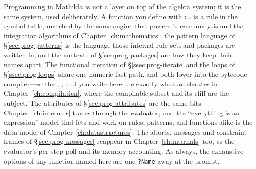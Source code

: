 Programming in Mathilda is not a layer on top of the algebra system; it is the
same system, used deliberately. A function you define with \texttt{:=} is a rule
in the symbol table, matched by the same engine that powers 's
case analysis and the integration algorithms of Chapter~\ref{ch:mathematics}; the
pattern language of \S\ref{sec:prog-patterns} is the language those internal rule
sets and packages are written in, and the contexts of \S\ref{sec:prog-packages} are
how they keep their names apart. The functional iteration of \S\ref{ssec:prog-iterate} and the
loops of \S\ref{ssec:prog-loops} share one numeric fast path, and both lower into
the bytecode compiler---so the , , and  you write here are
exactly what  accelerates in Chapter~\ref{ch:compilation}, where the
compilable subset and its cliff are the subject. The attributes of
\S\ref{sec:prog-attributes} are the same bits Chapter~\ref{ch:internals} traces
through the evaluator, and the ``everything is an expression'' model that lets
 and  work on rules, patterns, and functions alike is the
data model of Chapter~\ref{ch:datastructures}. The aborts, messages and constraint
frames of \S\ref{sec:prog-messages} reappear in Chapter~\ref{ch:internals} too, as
the evaluator's per-step poll and its memory accounting. As always, the exhaustive options
of any function named here are one \texttt{?Name} away at the prompt.
